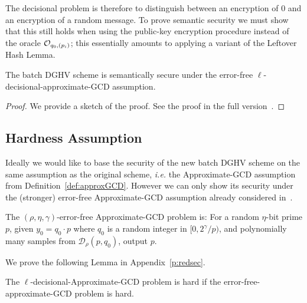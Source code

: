 \documentclass[11pt]{llncs}
\newcommand{\ie}{\textsl{i.e.}\xspace}
\newcommand{\Z}{{\mathbb Z}}
\newcommand*\Choose{\ensuremath{\mathsf{Choose}\ }}
\newcommand*\Output{\ensuremath{\mathsf{Output}\ }}
\begin{document}
The decisional
problem is therefore to distinguish between an encryption of $0$ and
an encryption of a random message. To prove semantic security 
we must show that this  still holds when using the public-key
encryption procedure instead of the oracle ${\cal 
    O}_{q_0,(p_i)}$; this essentially amounts to applying a variant
                    of the Leftover Hash Lemma.

\begin{theorem}\label{thm:l-dAGC}
The batch DGHV scheme is semantically secure under the
error-free $\ell$-decisional-approximate-GCD assumption.
\end{theorem}

\begin{proof}
We provide a sketch of the proof. See the proof in the full version~\cite{CLT2013a}.
\end{proof}


\subsection{Hardness Assumption}

Ideally we would like to base the security of the new batch DGHV scheme on
the same assumption as the original scheme, \ie the
Approximate-GCD assumption from Definition~\ref{def:approxGCD}.
However we can only show its security under the
(stronger) error-free Approximate-GCD assumption already considered in~\cite{CMNT2011,CNT2012}.


\begin{definition} 
The $(\rho, \eta,{\gamma})$-error-free Appro\-xi\-ma\-te-GCD pro\-blem
is: For a random $\eta$-bit prime $p$, given $y_0=q_0\cdot p$
where $q_0$ is a random integer in $[0,
  2^{\gamma}/p)$, and polynomially many samples from $\mathcal
  D_\rho(p,q_0)$, output $p$. 
\end{definition} 
We prove the following Lemma in Appendix~\ref{p:redsec}.

\begin{lemma}
\label{l:redsec}
The $\ell$-decisional-Approximate-GCD problem is hard if the
error-free-approximate-GCD problem is hard.
\end{lemma}
\end{document}
